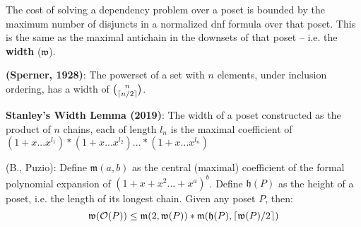 \documentclass{beamer}
\newcommand{\Oc}{\mathcal{O}}
\newcommand{\Mf}{\mathfrak{m}}
\newcommand{\Wf}{\mathfrak{w}}
\newcommand{\Hf}{\mathfrak{h}}
\DeclarePairedDelimiter\ceil{\lceil}{\rceil}
\begin{document}
\begin{frame}
The cost of solving a dependency problem over a poset is bounded by the maximum number of disjuncts in a normalized dnf formula over that poset. This is the same as the maximal antichain in the downsets of that poset -- i.e. the \textbf{width} (\(\Wf\)).

\begin{theorem}
\textbf{(Sperner, 1928)}: The powerset of a set with \(n\) elements, under inclusion ordering, has a width of \(\binom{n}{\ceil{n/2}}\).
\end{theorem}
\end{frame}

\begin{frame}

\begin{lemma}
\textbf{Stanley's Width Lemma (2019)}: The width of a poset constructed as the product of \(n\) chains, each of length \(l_n\) is the maximal coefficient of \((1+x...x^{l_1})*(1+x...x^{l_2})...*(1+x...x^{l_n})\)
\end{lemma}

\begin{theorem}
(B., Puzio): Define \(\Mf(a,b)\) as the central (maximal) coefficient of the formal polynomial expansion of \((1 + x + x^2 ... + x^a)^b\). Define \(\Hf(P)\) as the height of a poset, i.e. the length of its longest chain. Given any poset \(P\), then:
\begin{equation*}
 \Wf(\Oc(P)) \le \Mf(2,\Wf(P)) * \Mf(\Hf(P),\ceil{\Wf(P)/2})
\end{equation*}
\end{theorem}
\end{frame}
\end{document}
